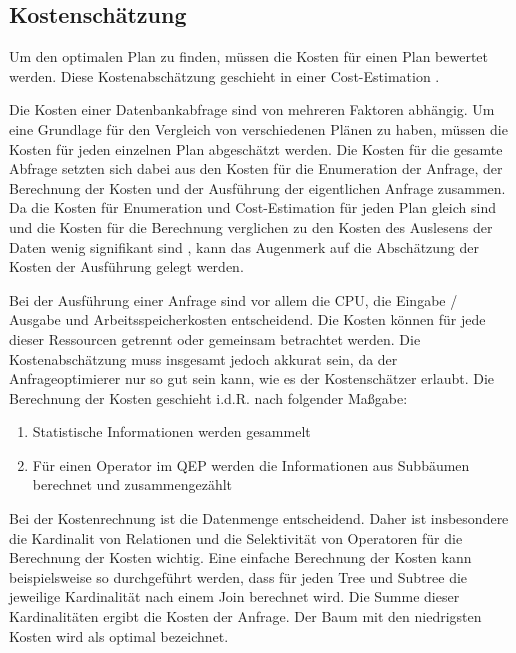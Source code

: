 \subsection{Kostenschätzung}

Um den optimalen Plan zu finden, müssen die Kosten für einen Plan bewertet werden. Diese Kostenabschätzung geschieht in einer Cost-Estimation \cite{bruno2011automated}. 

Die Kosten einer Datenbankabfrage sind von mehreren Faktoren abhängig. Um eine Grundlage für den Vergleich von verschiedenen Plänen zu haben, müssen die Kosten für jeden einzelnen Plan abgeschätzt werden. Die Kosten für die gesamte Abfrage setzten sich dabei aus den Kosten für die Enumeration der Anfrage, der Berechnung der Kosten und der Ausführung der eigentlichen Anfrage zusammen. Da die Kosten für Enumeration und Cost-Estimation für jeden Plan gleich sind und die Kosten für die Berechnung verglichen zu den Kosten des Auslesens der Daten wenig signifikant sind \cite{selinger1979access}, kann das Augenmerk auf die Abschätzung der Kosten der Ausführung gelegt werden.

Bei der Ausführung einer Anfrage sind vor allem die CPU, die Eingabe / Ausgabe und Arbeitsspeicherkosten entscheidend. Die Kosten können für jede dieser Ressourcen getrennt oder gemeinsam betrachtet werden. Die Kostenabschätzung muss insgesamt jedoch akkurat sein, da der Anfrageoptimierer nur so gut sein kann, wie es der Kostenschätzer erlaubt. Die Berechnung der Kosten geschieht i.d.R. nach folgender Maßgabe:

\begin{enumerate}
\item Statistische Informationen werden gesammelt
\item Für einen Operator im \ac{QEP} werden die Informationen aus Subbäumen berechnet und zusammengezählt
\end{enumerate}

Bei der Kostenrechnung ist die Datenmenge entscheidend. Daher ist insbesondere die Kardinalit von Relationen und die Selektivität von Operatoren für die Berechnung der Kosten
wichtig. Eine einfache Berechnung der Kosten kann beispielsweise so durchgeführt werden, dass für jeden Tree und Subtree die jeweilige Kardinalität nach einem Join berechnet wird. Die Summe dieser Kardinalitäten ergibt die Kosten der Anfrage. Der Baum mit den niedrigsten Kosten wird als optimal bezeichnet.